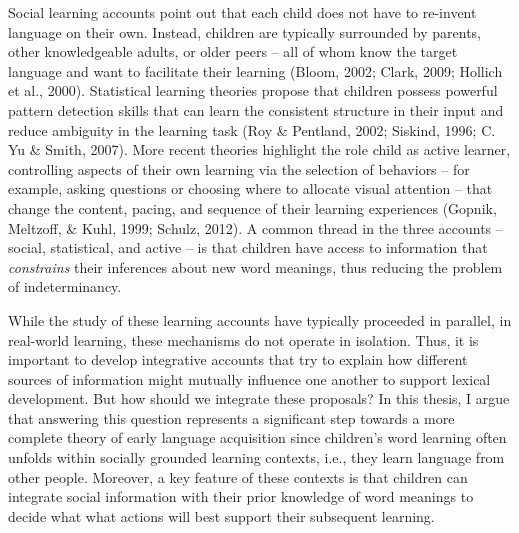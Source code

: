 \documentclass[oneside]{report}
\begin{document}
Social learning accounts point out that each child does not have to
re-invent language on their own. Instead, children are typically
surrounded by parents, other knowledgeable adults, or older peers -- all
of whom know the target language and want to facilitate their learning
(Bloom, 2002; Clark, 2009; Hollich et al., 2000). Statistical learning
theories propose that children possess powerful pattern detection skills
that can learn the consistent structure in their input and reduce
ambiguity in the learning task (Roy \& Pentland, 2002; Siskind, 1996; C.
Yu \& Smith, 2007). More recent theories highlight the role child as
active learner, controlling aspects of their own learning via the
selection of behaviors -- for example, asking questions or choosing
where to allocate visual attention -- that change the content, pacing,
and sequence of their learning experiences (Gopnik, Meltzoff, \& Kuhl,
1999; Schulz, 2012). A common thread in the three accounts -- social,
statistical, and active -- is that children have access to information
that \emph{constrains} their inferences about new word meanings, thus
reducing the problem of indeterminancy.

While the study of these learning accounts have typically proceeded in
parallel, in real-world learning, these mechanisms do not operate in
isolation. Thus, it is important to develop integrative accounts that
try to explain how different sources of information might mutually
influence one another to support lexical development. But how should we
integrate these proposals? In this thesis, I argue that answering this
question represents a significant step towards a more complete theory of
early language acquisition since children's word learning often unfolds
within socially grounded learning contexts, i.e., they learn language
from other people. Moreover, a key feature of these contexts is that
children can integrate social information with their prior knowledge of
word meanings to decide what what actions will best support their
subsequent learning.
\end{document}

